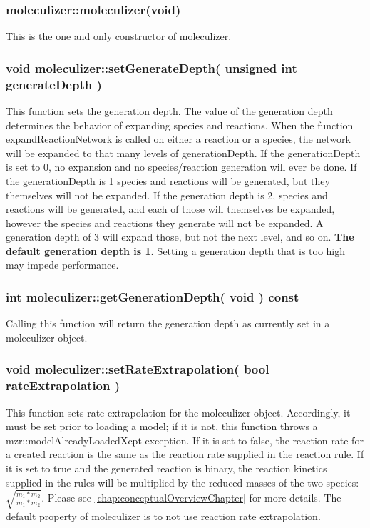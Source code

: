 \subsubsection{moleculizer::moleculizer(void)}
This is the one and only constructor of moleculizer.

\subsubsection{void moleculizer::setGenerateDepth( unsigned int
  generateDepth )}
This function sets the generation depth.  The value of the generation
depth determines the behavior of expanding species and reactions.
When the function expandReactionNetwork is called on either a reaction
or a species, the network will be expanded to that many levels of
generationDepth.  If the generationDepth is set to 0, no expansion and
no species/reaction generation will ever be done.  If the
generationDepth is 1 species and reactions will be generated, but they
themselves will not be expanded.  If the generation depth is 2,
species and reactions will be generated, and each of those will
themselves be expanded, however the species and reactions they
generate will not be expanded.  A generation depth of 3 will expand
those, but not the next level, and so on. \textbf{The default
  generation depth is 1.}  Setting a generation depth that is too high
may impede performance.  

\subsubsection{int moleculizer::getGenerationDepth( void ) const}
Calling this function will return the generation depth as currently
set in a moleculizer object.  

\subsubsection{void moleculizer::setRateExtrapolation( bool
  rateExtrapolation )}
This function sets rate extrapolation for the moleculizer object.
Accordingly, it must be set prior to loading a model; if it is not,
this function throws a mzr::modelAlreadyLoadedXcpt exception.  If
it is set to false, the reaction rate for a created reaction is the
same as the reaction rate supplied in the reaction rule.  If it is set
to true and the generated reaction is binary, the reaction kinetics
supplied in the rules will be multiplied by the reduced masses of the
two species: $\sqrt{ \frac{ m_1 * m_2}{m_1 * m_2}}$.  Please see
\ref{chap:conceptualOverviewChapter} for more details.  The default
property of moleculizer is to not use reaction rate extrapolation.

